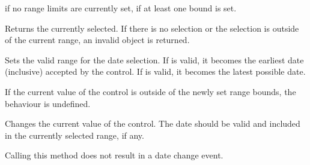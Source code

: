 


\false if no range limits are currently set, \true if at least one bound is
set.


\label{wxdatepickerctrlgetvalue}


Returns the currently selected. If there is no selection or the selection is
outside of the current range, an invalid object is returned.


\label{wxdatepickerctrlsetrange}


Sets the valid range for the date selection. If  is valid, it becomes
the earliest date (inclusive) accepted by the control. If  is valid,
it becomes the latest possible date.


If the current value of the control is outside of the newly set range bounds,
the behaviour is undefined.


\label{wxdatepickerctrlsetvalue}


Changes the current value of the control. The date should be valid and included
in the currently selected range, if any.

Calling this method does not result in a date change event.


